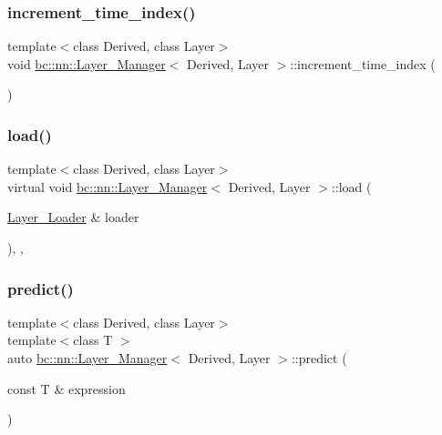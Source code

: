 \subsubsection{\texorpdfstring{increment\+\_\+time\+\_\+index()}{increment\_time\_index()}}
{\footnotesize\ttfamily template$<$class Derived, class Layer$>$ \\
void \hyperlink{structbc_1_1nn_1_1Layer__Manager}{bc\+::nn\+::\+Layer\+\_\+\+Manager}$<$ Derived, Layer $>$\+::increment\+\_\+time\+\_\+index (\begin{DoxyParamCaption}{ }\end{DoxyParamCaption})\hspace{0.3cm}{\ttfamily [inline]}}

\mbox{\label{structbc_1_1nn_1_1Layer__Manager_a1802dc0cfb6a4287ff5d45de6446feab}} 
\subsubsection{\texorpdfstring{load()}{load()}}
{\footnotesize\ttfamily template$<$class Derived, class Layer$>$ \\
virtual void \hyperlink{structbc_1_1nn_1_1Layer__Manager}{bc\+::nn\+::\+Layer\+\_\+\+Manager}$<$ Derived, Layer $>$\+::load (\begin{DoxyParamCaption}\item[{\hyperlink{structbc_1_1nn_1_1Layer__Loader}{Layer\+\_\+\+Loader} \&}]{loader }\end{DoxyParamCaption})\hspace{0.3cm}{\ttfamily [inline]}, {\ttfamily [override]}, {\ttfamily [virtual]}}

\mbox{\label{structbc_1_1nn_1_1Layer__Manager_a1cfda4ed795fa9a5193673f0e62e428a}} 
\subsubsection{\texorpdfstring{predict()}{predict()}}
{\footnotesize\ttfamily template$<$class Derived, class Layer$>$ \\
template$<$class T $>$ \\
auto \hyperlink{structbc_1_1nn_1_1Layer__Manager}{bc\+::nn\+::\+Layer\+\_\+\+Manager}$<$ Derived, Layer $>$\+::predict (\begin{DoxyParamCaption}\item[{const T \&}]{expression }\end{DoxyParamCaption})\hspace{0.3cm}{\ttfamily [inline]}}

